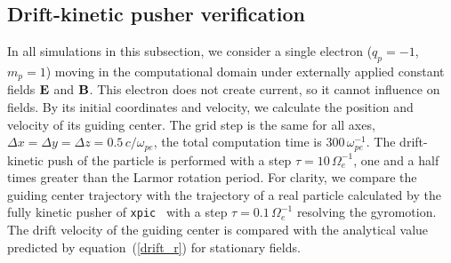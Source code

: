 \documentclass[final,3p]{elsarticle}
\begin{document}
\subsection{Drift-kinetic pusher verification}

In all simulations in this subsection, we consider a single electron ($q_p=-1$, $m_p=1$) moving in the computational domain under externally applied constant fields ${\bf E}$ and ${\bf B}$. This electron does not create current, so it cannot influence on fields. By its initial coordinates and velocity, we calculate the position and velocity of its guiding center. The grid step is the same for all axes, $\Delta x=\Delta y=\Delta z=0.5\,c/\omega_{pe}$, the total computation time is $300\,\omega_{pe}^{-1}$. The drift-kinetic push of the particle is performed with a step $\tau=10\,\Omega_e^{-1}$, one and a half times greater than the Larmor rotation period. For clarity, we compare the guiding center trajectory with the trajectory of a real particle calculated by the fully kinetic pusher of \texttt{xpic}~\cite{Kurshakov2026} with a step $\tau=0.1\,\Omega_e^{-1}$ resolving the gyromotion. The drift velocity of the guiding center is compared with the analytical value predicted by equation~(\ref{drift_r}) for stationary fields.
\end{document}
